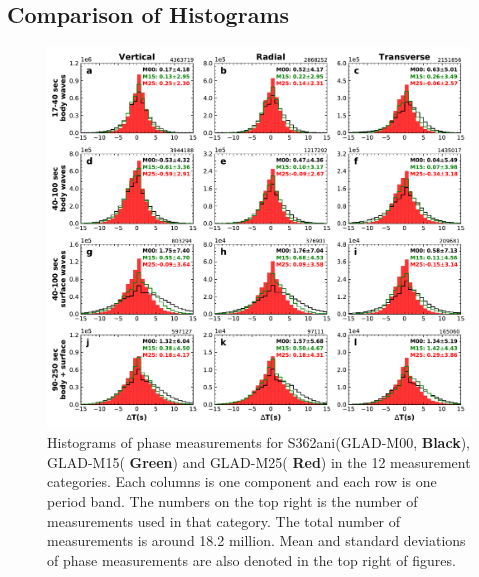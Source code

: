 \documentclass[extra,mreferee]{gji}
\begin{document}
\subsection{Comparison of Histograms}

\begin{figure}
  \centering
  \includegraphics[width=\textwidth]{figures/dt_histogram.pdf}
  \caption{Histograms of phase measurements for S362ani(GLAD-M00, \textbf{Black}), GLAD-M15(\textbf{{\color{ForestGreen} Green}}) and GLAD-M25(\textbf{{\color{Red} Red}}) in the 12 measurement categories. Each columns is one component and each row is one period band. The numbers on the top right is the number of measurements used in that category. The total number of measurements is around 18.2 million. Mean and standard deviations of phase measurements are also denoted in the top right of figures.}
  \label{fig:phase_hist}
\end{figure}
\end{document}
